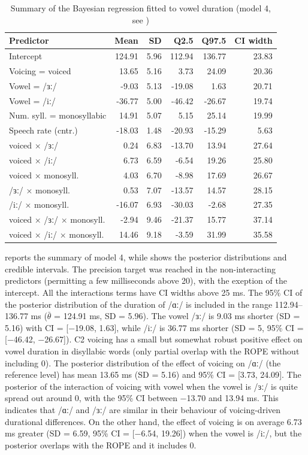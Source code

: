 \documentclass[12pt,a4paper,]{article}
\begin{document}
\begin{table}

\caption{\label{tab:vow-4-table}Summary of the Bayesian regression fitted to vowel duration (model 4, see )}
\centering
\fontsize{8}{10}\selectfont
\begin{tabular}[t]{lrrrrr}
\toprule
Predictor & Mean & SD & Q2.5 & Q97.5 & CI width\\
\midrule
Intercept & 124.91 & 5.96 & 112.94 & 136.77 & 23.83\\
Voicing = voiced & 13.65 & 5.16 & 3.73 & 24.09 & 20.36\\
Vowel = /ɜː/ & -9.03 & 5.13 & -19.08 & 1.63 & 20.71\\
Vowel = /iː/ & -36.77 & 5.00 & -46.42 & -26.67 & 19.74\\
Num. syll. = monosyllabic & 14.91 & 5.07 & 5.15 & 25.14 & 19.99\\
Speech rate (cntr.) & -18.03 & 1.48 & -20.93 & -15.29 & 5.63\\
voiced × /ɜː/ & 0.24 & 6.83 & -13.70 & 13.94 & 27.64\\
voiced × /iː/ & 6.73 & 6.59 & -6.54 & 19.26 & 25.80\\
voiced × monosyll. & 4.03 & 6.70 & -8.98 & 17.69 & 26.67\\
/ɜː/ × monosyll. & 0.53 & 7.07 & -13.57 & 14.57 & 28.15\\
/iː/ × monosyll. & -16.07 & 6.93 & -30.03 & -2.68 & 27.35\\
voiced × /ɜː/ × monosyll. & -2.94 & 9.46 & -21.37 & 15.77 & 37.14\\
voiced × /iː/ × monosyll. & 14.46 & 9.18 & -3.59 & 31.99 & 35.58\\
\bottomrule
\end{tabular}
\end{table}

 reports the summary of model 4, while
 shows the posterior distributions and credible
intervals. The precision target was reached in the non-interacting
predictors (permitting a few milliseconds above 20), with the exeption
of the intercept. All the interactions terms have CI widths above 25 ms.
The 95\% CI of the posterior distribution of the duration of /ɑː/ is
included in the range 112.94--136.77 ms (\(\bar{\theta}\) = 124.91 ms,
SD = 5.96). The vowel /ɜː/ is 9.03 ms shorter (SD = 5.16) with CI =
{[}−19.08, 1.63{]}, while /iː/ is 36.77 ms shorter (SD = 5, 95\% CI =
{[}−46.42, −26.67{]}). C2 voicing has a small but somewhat robust
positive effect on vowel duration in disyllabic words (only partial
overlap with the ROPE without including 0). The posterior distribution
of the effect of voicing on /ɑː/ (the reference level) has mean 13.65 ms
(SD = 5.16) and 95\% CI = {[}3.73, 24.09{]}. The posterior of the
interaction of voicing with vowel when the vowel is /ɜː/ is quite spread
out around 0, with the 95\% CI between −13.70 and 13.94 ms. This
indicates that /ɑː/ and /ɜː/ are similar in their behaviour of
voicing-driven durational differences. On the other hand, the effect of
voicing is on average 6.73 ms greater (SD = 6.59, 95\% CI = {[}−6.54,
19.26{]}) when the vowel is /iː/, but the posterior overlaps with the
ROPE and it includes 0.
\end{document}
